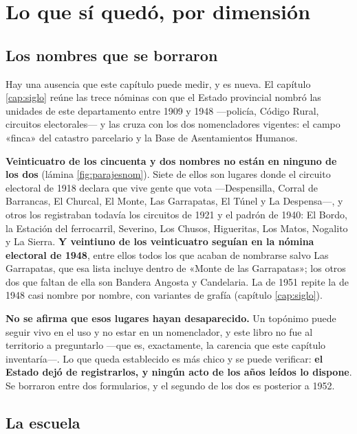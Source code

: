 \section{Lo que sí quedó, por dimensión}

\subsection*{Los nombres que se borraron}

Hay una ausencia que este capítulo puede medir, y es nueva. El capítulo \ref{cap:siglo} reúne las
trece nóminas con que el Estado provincial nombró las unidades de este departamento entre 1909 y
1948 ---policía, Código Rural, circuitos electorales--- y las cruza con los dos nomencladores
vigentes: el campo «finca» del catastro parcelario y la Base de Asentamientos Humanos.

\textbf{Veinticuatro de los cincuenta y dos nombres no están en ninguno de los dos} (lámina
\ref{fig:parajesnom}). Siete de ellos son lugares donde el circuito electoral de 1918 declara que
vive gente que vota ---Despensilla, Corral de Barrancas, El Churcal, El Monte, Las Garrapatas, El
Túnel y La Despensa---, y otros los registraban todavía los circuitos de 1921 y el padrón de 1940: El
Bordo, la Estación del ferrocarril, Severino, Los Chusos, Higueritas, Los Matos, Nogalito y La
Sierra. \textbf{Y veintiuno de los veinticuatro seguían en la nómina electoral de 1948}, entre ellos todos los
que acaban de nombrarse salvo Las Garrapatas, que esa lista incluye dentro de «Monte de las
Garrapatas»; los otros dos que faltan de ella son Bandera Angosta y Candelaria. La de 1951 repite la de 1948 casi nombre por nombre, con variantes de grafía (capítulo \ref{cap:siglo}).

\begin{cautela}
\textbf{No se afirma que esos lugares hayan desaparecido.} Un topónimo puede seguir vivo en el uso
y no estar en un nomenclador, y este libro no fue al territorio a preguntarlo ---que es,
exactamente, la carencia que este capítulo inventaría---. Lo que queda establecido es más chico y
se puede verificar: \textbf{el Estado dejó de registrarlos, y ningún acto de los años leídos lo dispone}. Se
borraron entre dos formularios, y el segundo de los dos es posterior a 1952.
\end{cautela}

\subsection*{La escuela}

